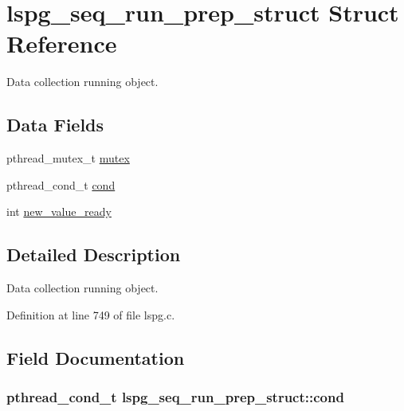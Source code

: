 \hypertarget{structlspg__seq__run__prep__struct}{\section{lspg\-\_\-seq\-\_\-run\-\_\-prep\-\_\-struct Struct Reference}
\label{structlspg__seq__run__prep__struct}
}


Data collection running object.  


\subsection*{Data Fields}
\begin{DoxyCompactItemize}
\item 
pthread\-\_\-mutex\-\_\-t \hyperlink{structlspg__seq__run__prep__struct_ad146cb91b5f7dd8bb283092c28781fe7}{mutex}
\item 
pthread\-\_\-cond\-\_\-t \hyperlink{structlspg__seq__run__prep__struct_acd83ea6994f57377716ff01c8ee7ce43}{cond}
\item 
int \hyperlink{structlspg__seq__run__prep__struct_a42d08888327e9059ddd69ddfec31b8a9}{new\-\_\-value\-\_\-ready}
\end{DoxyCompactItemize}


\subsection{Detailed Description}
Data collection running object. 

Definition at line 749 of file lspg.\-c.



\subsection{Field Documentation}
\hypertarget{structlspg__seq__run__prep__struct_acd83ea6994f57377716ff01c8ee7ce43}{
\subsubsection[{cond}]{\setlength{\rightskip}{0pt plus 5cm}pthread\-\_\-cond\-\_\-t lspg\-\_\-seq\-\_\-run\-\_\-prep\-\_\-struct\-::cond}}\label{structlspg__seq__run__prep__struct_acd83ea6994f57377716ff01c8ee7ce43}


